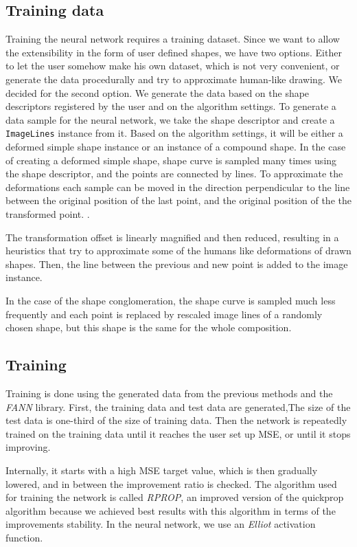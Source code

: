 \subsection{Training data}
Training the neural network requires a training dataset. Since we want to allow the extensibility in the form of user defined shapes, we have two options. Either to let the user somehow make his own dataset, which is not very convenient, or generate the data procedurally and try to approximate human-like drawing. 
We decided for the second option. We generate the data based on the shape descriptors registered by the user and on the algorithm settings. To generate a data sample for the neural network, we take the shape descriptor and create a \texttt{ImageLines} instance from it. 
Based on the algorithm settings, it will be either a deformed simple shape instance or an instance of a compound shape. In the case of creating a deformed simple shape, shape curve is sampled many times using the shape descriptor, and the points are connected by lines. 
To approximate the deformations each sample can be moved in the direction perpendicular to the line between the original position of the last point, and the original position of the the transformed point. .

The transformation  offset is linearly magnified and then reduced, resulting in a heuristics that try to approximate some of the humans like deformations of drawn shapes. Then, the line between the previous and new point is added to the image instance. 

In the case of the shape conglomeration, the shape curve is sampled much less frequently and each point is replaced by rescaled image lines of a randomly chosen shape, but this shape is the same for the whole composition. 

\subsection{Training}
Training is done using the generated data from the previous methods and the \emph{FANN} library. 
First, the training data and test data are generated,The size of the test data is one-third of the size of training data. Then the network is repeatedly trained on the training data until it reaches the user set up MSE, or until it stops improving.

Internally, it starts with a high MSE target value, which is then gradually lowered, and in between the improvement ratio is checked. The algorithm used for training the network is called \emph{RPROP}, an improved version of the quickprop algorithm because we achieved best results with this algorithm in terms of the improvements stability. In the neural network, we use an \emph{Elliot} activation function.

